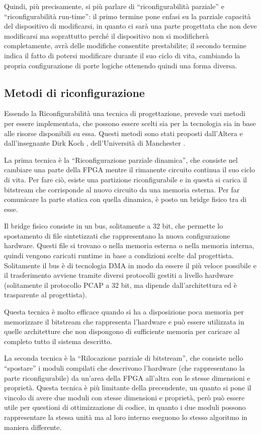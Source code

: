 \documentclass[11pt]{article} %
\begin{document}
Quindi, più precisamente, si più parlare di ``riconfigurabilità parziale'' e ``riconfigurabilità run-time'': il primo termine pone enfasi su la parziale capacità del dispositivo di modificarsi, in quanto ci sarà una parte progettata che non deve modificarsi ma soprattutto perché il dispositivo non si modificherà completamente, avrà delle modifiche consentite prestabilite; il secondo termine indica il fatto di potersi modificare durante il suo ciclo di vita, cambiando la propria configurazione di porte logiche ottenendo quindi una forma diversa.

\subsection{Metodi di riconfigurazione}

Essendo la Riconfigurabilità una tecnica di progettazione, prevede vari metodi per essere implementata, che possono essere scelti sia per la tecnologia sia in base alle risorse disponibili su essa. Questi metodi sono stati proposti dall'Altera \cite{PR1} e dall'insegnante Dirk Koch , dell'Università di Manchester \cite{PR2}.

La prima tecnica è la ``Riconfigurazione parziale dinamica'', che consiste nel cambiare una parte della FPGA mentre il rimanente circuito continua il suo ciclo di vita. Per fare ciò, esiste una partizione riconfigurabile e in questa si carica il bitstream che corrisponde al nuovo circuito da una memoria esterna. Per far comunicare la parte statica con quella dinamica, è posto un bridge fisico tra di esse. 

Il bridge fisico consiste in un bus, solitamente a 32 bit, che permette lo spostamento di file sintetizzati che rappresentano la nuova configurazione hardware. Questi file si trovano o nella memoria esterna o nella memoria interna, quindi vengono caricati runtime in base a condizioni scelte dal progettista. Solitamente il bus è di tecnologia DMA in modo da essere il più veloce possibile e il trasferimento avviene tramite diversi protocolli gestiti a livello hardware (solitamente il protocollo PCAP a 32 bit, ma dipende dall'architettura ed è trasparente al progettista).

Questa tecnica è molto efficace quando si ha a disposizione poca memoria per memorizzare il bitstream che rappresenta l'hardware e può essere utilizzata in quelle architetture che non dispongono di sufficiente memoria per caricare al completo tutto il sistema descritto.


La seconda tecnica è la ``Rilocazione parziale di bitstream'', che consiste nello ``spostare'' i moduli compilati che descrivono l'hardware (che rappresentano la parte riconfigurabile) da un'area della FPGA all'altra con le stesse dimensioni e proprietà. Questa tecnica è più limitante della precendente, un quanto si pone il vincolo di avere due moduli con stesse dimensioni e proprietà, però può essere utile per questioni di ottimizzazione di codice, in quanto i due moduli possono rappresentare la stessa unità ma al loro interno eseguono lo stesso algoritmo in maniera differente.
\end{document}
